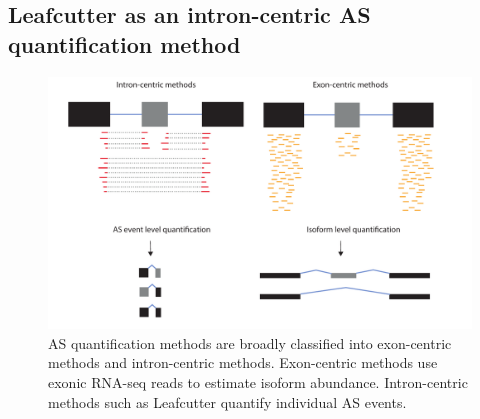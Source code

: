 \subsection{Leafcutter as an intron-centric AS quantification method}
\begin{figure}
    \centering
    \includegraphics[width=\textwidth]{intron_exon_centric}
    \caption[Broad classification of alternative splicing quantification methods]{AS quantification methods are broadly classified into exon-centric methods and intron-centric methods. Exon-centric methods use exonic RNA-seq reads to estimate isoform abundance. Intron-centric methods such as Leafcutter quantify individual AS events. }
    \label{fig:intron_exon_centric}   
  \end{figure}
